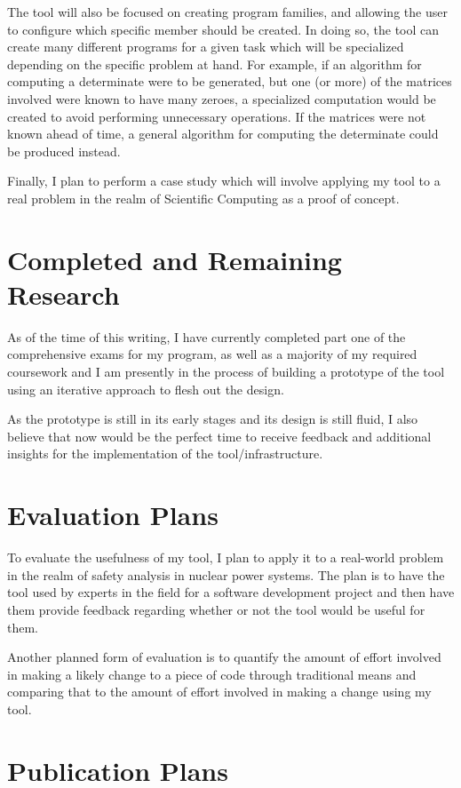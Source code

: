 \documentclass[11pt]{article} %
\begin{document}
The tool will also be focused on creating program families, and allowing the
user to configure which specific member should be created. In doing so, the tool
can create many different programs for a given task which will be specialized
depending on the specific problem at hand. For example, if an algorithm for
computing a determinate were to be generated, but one (or more) of the matrices
involved were known to have many zeroes, a specialized computation would be
created to avoid performing unnecessary operations. If the matrices were not
known ahead of time, a general algorithm for computing the determinate could be
produced instead.

Finally, I plan to perform a case study which will involve applying my tool to
a real problem in the realm of Scientific Computing as a proof of concept.

\section{Completed and Remaining Research}

As of the time of this writing, I have currently completed part one of the
comprehensive exams for my program, as well as a majority of my required
coursework and I am presently in the process of building a prototype of the tool
using an iterative approach to flesh out the design.

As the prototype is still in its early stages and its design is still fluid, I
also believe that now would be the perfect time to receive feedback and 
additional insights for the implementation of the tool/infrastructure.

\section{Evaluation Plans}

To evaluate the usefulness of my tool, I plan to apply it to a real-world
problem in the realm of safety analysis in nuclear power systems. The plan is to
have the tool used by experts in the field for a software development project
and then have them provide feedback regarding whether or not the tool would be
useful for them.

Another planned form of evaluation is to quantify the amount of effort
involved in making a likely change to a piece of code through traditional means
and comparing that to the amount of effort involved in making a change using my
tool.

\section{Publication Plans}
\end{document}
